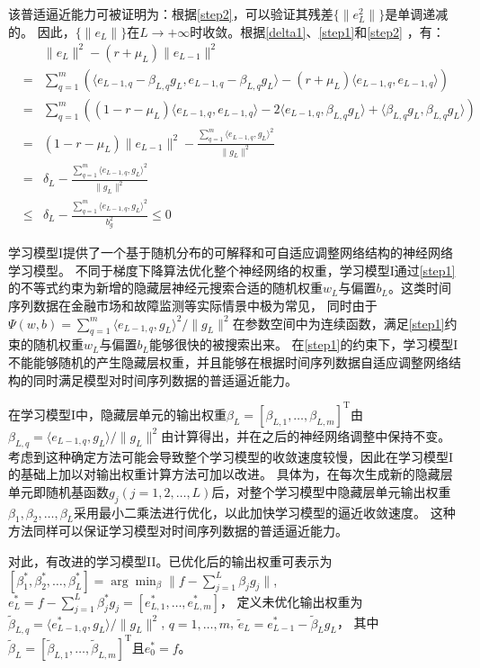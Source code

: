 该普适逼近能力可被证明为：根据\autoref{step2}，可以验证其残差$\{\|e_{L}^2\|\}$是单调递减的。
因此，$\{\|e_L\|\}$在$L\rightarrow +\infty$时收敛。根据\autoref{delta1}、\autoref{step1}和\autoref{step2}
，有：
\begin{eqnarray}
    &&\|e_L\|^2-(r+\mu_L)\|e_{L-1}\|^2\nonumber\\&=& \sum_{q=1}^m\left(\langle e_{L-1,q}-\beta_{L,q}g_L,e_{L-1,q}-\beta_{L,q}g_L\rangle-(r+\mu_L)\langle e_{L-1,q},e_{L-1,q}\rangle\right)\nonumber\\
    &=&\sum_{q=1}^m\left((1-r-\mu_L)\langle e_{L-1,q},e_{L-1,q}\rangle-2\langle e_{L-1,q},\beta_{L,q}g_L\rangle+\langle\beta_{L,q}g_L,\beta_{L,q}g_L\rangle\right)\nonumber\\
    &=&(1-r-\mu_L)\|e_{L-1}\|^2-\frac{\sum_{q=1}^m\langle e_{L-1,q},g_L\rangle^2}{\|g_L\|^2}\nonumber\\
    &=&\delta_L-\frac{\sum_{q=1}^m\langle e_{L-1,q},g_L\rangle^2}{\|g_L\|^2}\nonumber\\
    &\leq& \delta_L-\frac{\sum_{q=1}^m\langle e_{L-1,q},g_L\rangle^2}{b_g^2}\leq0
    \end{eqnarray}

学习模型I提供了一个基于随机分布的可解释和可自适应调整网络结构的神经网络学习模型。
不同于梯度下降算法优化整个神经网络的权重，学习模型I通过\autoref{step1}的不等式约束为新增的隐藏层神经元搜索合适的随机权重$w_L$与偏置$b_L$。这类时间序列数据在金融市场和故障监测等实际情景中极为常见，
同时由于 $\Psi(w,b)=\sum_{q=1}^m\langle e_{L-1,q},g_L\rangle^2/\|g_{L}\|^2$在参数空间中为连续函数，满足\autoref{step1}约束的随机权重$w_L$与偏置$b_L$能够很快的被搜索出来。
在\autoref{step1}的约束下，学习模型I不能能够随机的产生隐藏层权重，并且能够在根据时间序列数据自适应调整网络结构的同时满足模型对时间序列数据的普适逼近能力。

在学习模型I中，隐藏层单元的输出权重$\beta_L=[\beta_{L,1},\ldots,\beta_{L,m}]^{\mathrm{T}}$由$\beta_{L,q}=\langle e_{L-1,q},g_L\rangle/\|g_L\|^2$由计算得出，并在之后的神经网络调整中保持不变。
考虑到这种确定方法可能会导致整个学习模型的收敛速度较慢，因此在学习模型I的基础上加以对输出权重计算方法可加以改进。
具体为，在每次生成新的隐藏层单元即随机基函数$g_j (j=1,2,\ldots,L)$后，对整个学习模型中隐藏层单元输出权重$\beta_1,\beta_2,\ldots,\beta_{L}$采用最小二乘法进行优化，以此加快学习模型的逼近收敛速度。
这种方法同样可以保证学习模型对时间序列数据的普适逼近能力。

对此，有改进的学习模型II。已优化后的输出权重可表示为
$[\beta_1^{*}, \beta_2^{*},\ldots,\beta_{L}^{*}]=\arg \min_{\beta}\|f-\sum_{j=1}^{L}\beta_jg_j\|$, $e_{L}^{*}=f-\sum_{j=1}^{L}\beta_j^{*}g_j=[e_{L,1}^{*},\ldots,e_{L,m}^{*}]$，
定义未优化输出权重为$\tilde{\beta}_{L,q}=\langle e_{L-1,q}^{*},g_L\rangle/\|g_L\|^2$, $q=1,\ldots,m$, $\tilde{e}_{L}=e_{L-1}^{*}-\tilde{\beta}_{L}g_L$，
其中$\tilde{\beta}_{L}=[\tilde{\beta}_{L,1},\ldots,\tilde{\beta}_{L,m}]^{\mathrm{T}}$且$e_0^{*}=f$。

